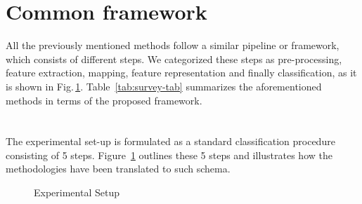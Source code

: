 \section{Common framework}
All the previously mentioned methods follow a similar pipeline or framework, which consists of different steps. 
We categorized these steps as pre-processing, feature extraction, mapping, feature representation and finally classification, as it is shown in Fig.\,\ref{fig:ML-scheme}.
Table~\ref{tab:survey-tab} summarizes the aforementioned methods in terms of the proposed framework.






\section{}\label{sec:method}\label{sec:exp}
The experimental set-up is formulated as a standard classification procedure consisting of 5 steps.
Figure~\ref{fig:ML-scheme} outlines these 5 steps and illustrates how the methodologies have been translated to such schema.

\begin{figure}
    \caption{Experimental Setup}
  \label{fig:ML-scheme}
\end{figure}



\subsection{}

